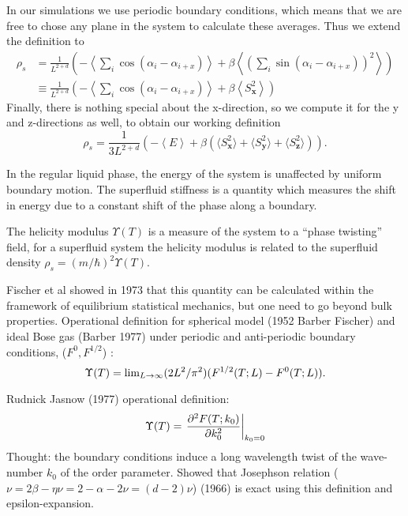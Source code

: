 In our simulations we use periodic boundary conditions, which means that we are free to chose any plane in the system to calculate these averages. Thus we extend the definition to
\begin{align}
  \rho_s &= \frac{1}{L^{2+d}}\left(-\left\langle \sum_{i}\cos(\alpha_i -\alpha_{i+x} )\right\rangle + \beta\left\langle\left(\sum_{i}\sin(\alpha_i - \alpha_{i+x}) \right)^2\right\rangle\right) \\
  &\equiv\frac{1}{L^{2+d}}\left(-\left\langle \sum_{i}\cos(\alpha_i -\alpha_{i+x} )\right\rangle + \beta\left\langle S^2_{\bm{x}} \right\rangle\right)
\end{align}
Finally, there is nothing special about the x-direction, so we compute it for the y and z-directions as well, to obtain our working definition
\begin{equation}
  \rho_s = \frac{1}{3 L^{2+d}}\left(-\left\langle E \right\rangle + \beta\left( \langle S^2_{\bm{x}}\rangle + \langle S^2_{\bm{y}}\rangle + \langle S^2_{\bm{z}}\rangle\right) \right).
  \label{}
\end{equation}



In the regular liquid phase, the energy of the system is unaffected by uniform boundary motion. The superfluid stiffness is a quantity which measures the shift in energy due to a constant shift of the phase along a boundary.

The helicity modulus $\Upsilon(T)$ is a measure of the system to a ``phase twisting'' field, for a superfluid system the helicity modulus is related to the superfluid density
$\rho_s = (m/\hbar)^2 \Upsilon(T)$.

Fischer et al showed in 1973 that this quantity can be calculated within the framework of equilibrium statistical mechanics, but one need to go beyond bulk properties.
Operational definition for spherical model (1952 Barber Fischer) and ideal Bose gas (Barber 1977) under periodic and anti-periodic boundary conditions, ($F^{0},F^{1/2}$) :
\begin{equation}
  \Upsilon(T) = \textrm{lim}_{L\rightarrow \infty} (2L^2/\pi^2) (F^{1/2} (T;L)-F^0(T;L)).
  \label{}
\end{equation}

Rudnick Jasnow (1977) operational definition: 
\begin{equation}
  \Upsilon(T) = \left. \frac{  \partial^2F(T;k_0)}{\partial k^2_0}\right|_{k_0 =0}
  \label{}
\end{equation}
Thought: the boundary conditions induce a long wavelength twist of the wave-number $k_0$ of the order parameter.
Showed that Josephson relation ($\nu = 2\beta -\eta\nu = 2 - \alpha -2\nu = (d -2)\nu$) (1966) is exact using this definition and epsilon-expansion.




